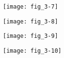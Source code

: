 \sect{\lipsum*[22][7]}

\lipsum[44-51]

\begin{figure}[p]
   \centering
   \texttt{[image: fig\_3-7]}
   \caption[{\lipsum*[37][1]}]{\lipsum*[37][1-2]}
   \label{fig:fig_3-7}
\end{figure}

\begin{figure}[p]
   \centering
   \texttt{[image: fig\_3-8]}
   \caption[{\lipsum*[38][1]}]{\lipsum*[38][1-2]}
   \label{fig:fig_3-8}
\end{figure}

\begin{figure}[p]
   \centering
   \texttt{[image: fig\_3-9]}
   \caption[{\lipsum*[39][1]}]{\lipsum*[39][1-2]}
   \label{fig:fig_3-9}
\end{figure}

\begin{figure}[p]
   \centering
   \texttt{[image: fig\_3-10]}
   \caption[{\lipsum*[40][1]}]{\lipsum*[40][1-2]}
   \label{fig:fig_3-10}
\end{figure}
